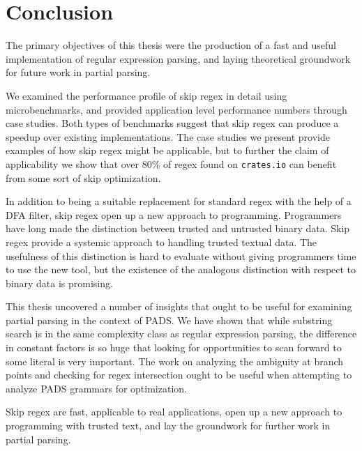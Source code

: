 \chapter{Conclusion}
\label{chapter:conclusion}

The primary objectives of this thesis were the production of a
fast and useful implementation of regular expression parsing,
and laying theoretical groundwork for future work in partial
parsing.

We examined the performance profile of skip regex in detail
using microbenchmarks, and provided application level performance
numbers through case studies. Both types of benchmarks suggest
that skip regex can produce a speedup over existing
implementations. The case studies we present provide examples
of how skip regex might be applicable, but to further
the claim of applicability we show that over 80\% of regex
found on \verb'crates.io' can benefit from some sort of
skip optimization.

In addition to being a suitable replacement for standard
regex with the help of a DFA filter, skip regex open up
a new approach to programming. Programmers have long made
the distinction between trusted and untrusted binary data.
Skip regex provide a systemic approach to handling trusted
textual data. The usefulness of this distinction is hard to
evaluate without giving programmers time to use the new tool,
but the existence of the analogous distinction with respect to
binary data is promising.

This thesis uncovered a number of insights that ought to be
useful for examining partial parsing in the context of PADS.
We have shown that while substring search is in the same complexity
class as regular expression parsing, the difference in constant
factors is so huge that looking for opportunities to scan forward
to some literal is very important. The work on analyzing the
ambiguity at branch points and checking for regex intersection
ought to be useful when attempting to analyze PADS grammars
for optimization.

Skip regex are fast, applicable to real applications, open
up a new approach to programming with trusted text, and lay
the groundwork for further work in partial parsing.
